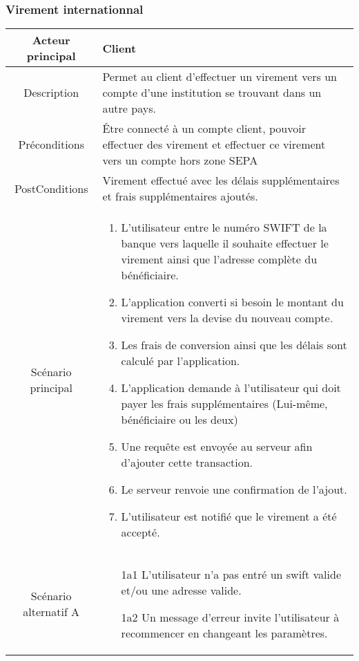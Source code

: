 \documentclass{article}
\begin{document}
\newpage
\subsubsection{Virement internationnal}
\begin{table}[]
   \begin{tabular}{|c|p{10cm}|}
      \hline
      Acteur principal&Client\\
      \hline
      Description&Permet au client d'effectuer un virement vers un compte d'une institution se trouvant dans un autre pays.\\
      \hline
      Préconditions&Être connecté à un compte client, pouvoir effectuer des virement et effectuer ce virement vers un compte hors zone SEPA\\
      \hline
      PostConditions&Virement effectué avec les délais supplémentaires et frais supplémentaires ajoutés.\\
      \hline
      Scénario principal& 
            \begin{enumerate}
               \item L'utilisateur entre le numéro SWIFT de la banque vers laquelle il souhaite effectuer le virement ainsi que l'adresse complète du bénéficiaire.
               \item L'application converti si besoin le montant du virement vers la devise du nouveau compte.
               \item Les frais de conversion ainsi que les délais sont calculé par l'application.
               \item L'application demande à l'utilisateur qui doit payer les frais supplémentaires (Lui-même, bénéficiaire ou les deux)
               \item Une requête est envoyée au serveur afin d'ajouter cette transaction.
               \item Le serveur renvoie une confirmation de l'ajout.
               \item L'utilisateur est notifié que le virement a été accepté.
            \end{enumerate}     \\
      \hline
      Scénario alternatif A&
            \begin{itemize}
               \item[1a1] L'utilisateur n'a pas entré un swift valide et/ou une adresse valide.
               \item[1a2] Un message d'erreur invite l'utilisateur à recommencer en changeant les paramètres. 

\end{itemize}
\end{tabular}
\end{table}
\end{document}

